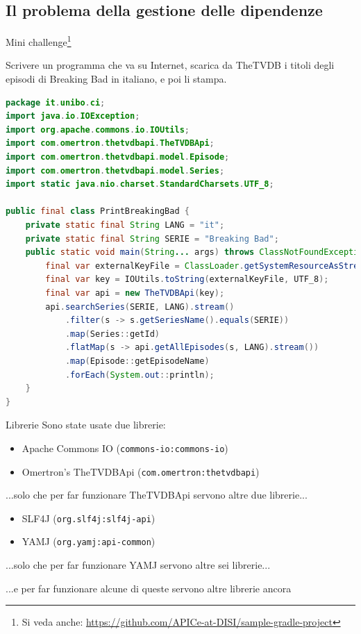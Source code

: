 \documentclass[xcolor=dvipsnames,presentation]{beamer}
\begin{document}
\subsection{Il problema della gestione delle dipendenze}



\begin{frame}[fragile]{Mini challenge\footnote{Si veda anche: \url{https://github.com/APICe-at-DISI/sample-gradle-project}}}
\begin{block}{}
Scrivere un programma che va su Internet, scarica da TheTVDB i titoli degli episodi di Breaking Bad in italiano, e poi li stampa.
\end{block}



\begin{lstlisting}[language=java,basicstyle=\tiny\ttfamily,columns=fullflexible]
package it.unibo.ci;
import java.io.IOException;
import org.apache.commons.io.IOUtils;
import com.omertron.thetvdbapi.TheTVDBApi;
import com.omertron.thetvdbapi.model.Episode;
import com.omertron.thetvdbapi.model.Series;
import static java.nio.charset.StandardCharsets.UTF_8;

public final class PrintBreakingBad {
    private static final String LANG = "it";
    private static final String SERIE = "Breaking Bad";
    public static void main(String... args) throws ClassNotFoundException, IOException {
        final var externalKeyFile = ClassLoader.getSystemResourceAsStream("TheTVDBAPIKey")
        final var key = IOUtils.toString(externalKeyFile, UTF_8);
        final var api = new TheTVDBApi(key);
        api.searchSeries(SERIE, LANG).stream()
            .filter(s -> s.getSeriesName().equals(SERIE))
            .map(Series::getId)
            .flatMap(s -> api.getAllEpisodes(s, LANG).stream())
            .map(Episode::getEpisodeName)
            .forEach(System.out::println);
    }
}
\end{lstlisting}
\end{frame}

\begin{frame}{Librerie}
    Sono state usate due librerie:
    \begin{itemize}
        \item Apache Commons IO (\texttt{commons-io:commons-io})
        \item Omertron's TheTVDBApi (\texttt{com.omertron:thetvdbapi})
    \end{itemize}
    ...solo che per far funzionare TheTVDBApi servono altre due librerie...
    \begin{itemize}
        \item SLF4J (\texttt{org.slf4j:slf4j-api})
        \item YAMJ (\texttt{org.yamj:api-common})
    \end{itemize}
    ...solo che per far funzionare YAMJ servono altre sei librerie...

    ...e per far funzionare alcune di queste servono altre librerie ancora
\end{frame}
\end{document}
